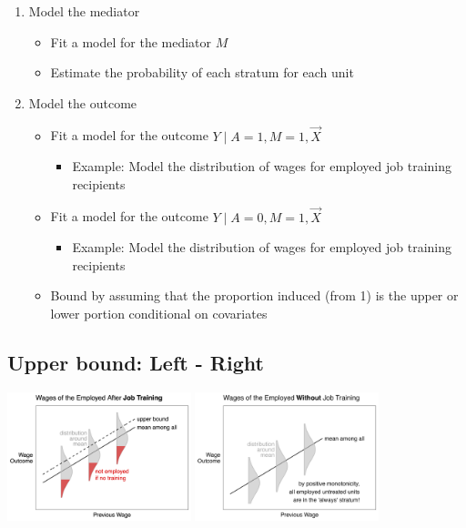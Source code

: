 \documentclass[
]{book}
\providecommand{\tightlist}{%
  \setlength{\itemsep}{0pt}\setlength{\parskip}{0pt}}
\begin{document}
\begin{enumerate}
\def\labelenumi{\arabic{enumi})}
\tightlist
\item
  Model the mediator

  \begin{itemize}
  \tightlist
  \item
    Fit a model for the mediator \(M\)
  \item
    Estimate the probability of each stratum for each unit
  \end{itemize}
\item
  Model the outcome

  \begin{itemize}
  \tightlist
  \item
    Fit a model for the outcome \(Y\mid A = 1, M = 1, \vec{X}\)

    \begin{itemize}
    \tightlist
    \item
      Example: Model the distribution of wages for employed job training recipients
    \end{itemize}
  \item
    Fit a model for the outcome \(Y\mid A = 0, M = 1, \vec{X}\)

    \begin{itemize}
    \tightlist
    \item
      Example: Model the distribution of wages for employed job training recipients
    \end{itemize}
  \item
    Bound by assuming that the proportion induced (from 1) is the upper or lower portion conditional on covariates
  \end{itemize}
\end{enumerate}

\subsection{Upper bound: Left - Right}\label{upper-bound-left---right}

\includegraphics[width=0.4\textwidth,height=\textheight]{assets/teach_jobtrain_upper.png}
\includegraphics[width=0.4\textwidth,height=\textheight]{assets/teach_jobtrain_control.png}
\end{document}
